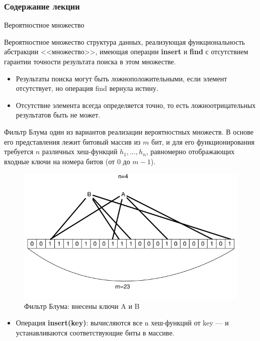\documentclass{beamer}
\begin{document}
\begin{frame}
  \frametitle{Содержание лекции}
  \tableofcontents[current]
\end{frame}

\begin{frame}{Вероятностное множество}
    \begin{block}{Вероятностное множество}
        структура данных, реализующая функциональность абстракции <<множество>>, имеющая операции \textbf{insert} и \textbf{find} с отсутствием гарантии точности результата поиска в этом множестве. 
    \end{block}
    \begin{itemize}
        \item Результаты поиска могут быть ложноположительными, если элемент отсутствует, но операция find вернула истину. 
        \item Отсутствие элемента всегда определяется точно, то есть ложноотрицательных результатов быть не может.
    \end{itemize}
\end{frame}

\begin{frame}
    \begin{block}{Фильтр Блума}
        один из вариантов реализации вероятностных множеств. В основе его представления лежит битовый массив из $m$ бит, и для его функционирования требуется $n$ различных хеш-функций $h_1, \dots, h_n$, равномерно отображающих входные ключи на номера битов (от $0$ до $m−1$).
    \end{block}
	\begin{figure}[h]
		\centering
		\includegraphics[scale=0.3]{images/lec08-pic10.png}
		\caption{Фильтр Блума: внесены ключи A и B}
	\end{figure}
    \begin{itemize}
        \item Операция \textbf{insert(key)}: вычисляются все n хеш-функций от key — и устанавливаются соответствующие биты в массиве.
    \end{itemize}	
\end{frame}
\end{document}
